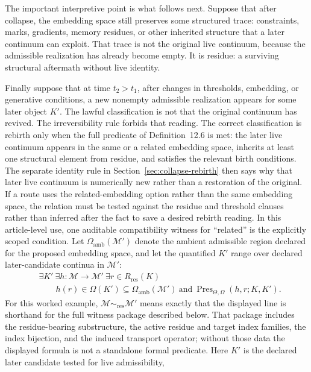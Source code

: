 The important interpretive point is what follows next. Suppose that after collapse, the embedding
space still preserves some structured trace: constraints, marks, gradients, memory residues, or
other inherited structure that a later continuum can exploit. That trace is not the original live
continuum, because the admissible realization has already become empty. It is residue: a surviving
structural aftermath without live identity.

Finally suppose that at time \(t_2>t_1\), after changes in thresholds, embedding, or generative
conditions, a new nonempty admissible realization appears for some later object \(K'\). The
lawful classification is not that the original continuum has revived. The irreversibility rule
forbids that reading. The correct classification is rebirth only when the full predicate of
Definition~12.6 is met: the later live continuum appears in the same or a related
embedding space, inherits at least one structural element from residue, and satisfies the relevant
birth conditions. The separate identity rule in Section~\ref{sec:collapse-rebirth}
then says why that later live continuum is numerically new rather than a
restoration of the original.
If a route uses the related-embedding option rather than the same embedding
space, the relation must be tested against the residue and threshold clauses
rather than inferred after the fact to save a desired rebirth reading. In this
article-level use, one auditable compatibility witness for ``related'' is the explicitly
scoped condition. Let \(\Omega_{\mathrm{amb}}(\mathcal{M}')\) denote the
ambient admissible region declared for the proposed embedding space, and let
the quantified \(K'\) range over declared later-candidate continua in
\(\mathcal{M}'\):
\[
  \begin{aligned}
  &\exists K'\ \exists h:\mathcal{M}\to\mathcal{M}'\ \exists r\in R_{\mathrm{res}}(K)\\
  &\qquad h(r)\in\Omega(K')\subseteq\Omega_{\mathrm{amb}}(\mathcal{M}')\ \text{and}\
  \operatorname{Pres}_{\Theta,\Omega}(h,r;K,K').
  \end{aligned}
\]
For this worked example,
\(\mathcal{M}\sim_{\mathrm{res}}\mathcal{M}'\) means exactly that the
displayed line is shorthand for the full witness package described below. That
package includes the residue-bearing substructure, the active residue and
target index families, the index bijection, and the induced transport
operator; without those data the displayed formula is not a standalone formal
predicate.
Here \(K'\) is the declared later candidate tested for live admissibility,
